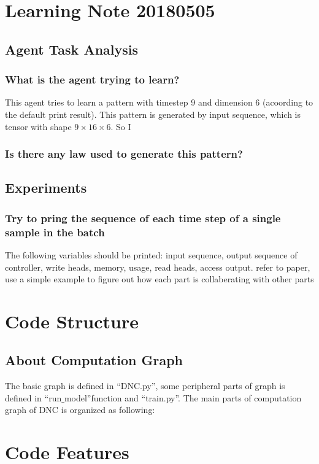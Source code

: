\documentclass{article}
\begin{document}
\section{Learning Note 20180505}
\subsection{Agent Task Analysis}
\subsubsection{What is the agent trying to learn?}
This agent tries to learn a pattern with timestep 9 and dimension 6 (acoording to the default print result). This pattern is generated by input sequence, which is tensor with shape $9\times16\times6$. So I
\subsubsection{Is there any law used to generate this pattern?} 


\subsection{Experiments}
\subsubsection{Try to pring the sequence of each time step of a single sample in the batch}
The following variables should be printed: input sequence, output sequence of controller, write heads, memory, usage, read heads, access output. {\color{red}refer to paper, use a simple example to figure out how each part is collaberating with other parts}


\section{Code Structure}
\subsection{About Computation Graph}
The basic graph is defined in ``DNC.py'', some peripheral parts of graph is defined in ``run$\_$model''function and ``train.py''. The main parts of computation graph of DNC is organized as following:
\section{Code Features}
\end{document}
